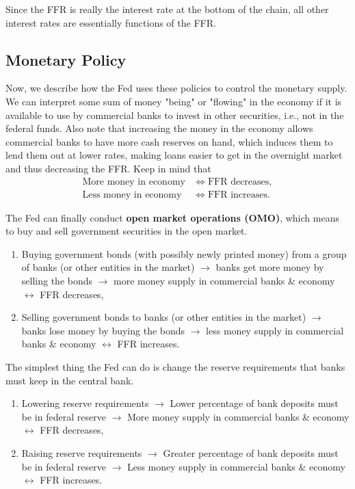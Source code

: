 \documentclass{article}
\begin{document}
    Since the FFR is really the interest rate at the bottom of the chain, all other interest rates are essentially functions of the FFR.   

  \subsection{Monetary Policy}

    Now, we describe how the Fed uses these policies to control the monetary supply. We can interpret some sum of money "being" or "flowing" in the economy if it is available to use by commercial banks to invest in other securities, i.e., not in the federal funds. Also note that increasing the money in the economy allows commercial banks to have more cash reserves on hand, which induces them to lend them out at lower rates, making loans easier to get in the overnight market and thus decreasing the FFR. Keep in mind that
    \begin{align*} 
      \text{More money in economy} & \iff \text{FFR decreases}, \\
      \text{Less money in economy} & \iff \text{FFR increases}.
    \end{align*}

    \begin{definition}
      The Fed can finally conduct \textbf{open market operations (OMO)}, which means to buy and sell government securities in the open market.
      \begin{enumerate}
        \item Buying government bonds (with possibly newly printed money) from a group of banks (or other entities in the market) $\rightarrow$ banks get more money by selling the bonds $\rightarrow$ more money supply in commercial banks \& economy $\leftrightarrow$ FFR decreases,
        \item Selling government bonds to banks (or other entities in the market) $\rightarrow$ banks lose money by buying the bonds $\rightarrow$ less money supply in commercial banks \& economy $\leftrightarrow$ FFR increases.
      \end{enumerate}
    \end{definition}

    \begin{definition}
      The simplest thing the Fed can do is change the reserve requirements that banks must keep in the central bank.
      \begin{enumerate}
        \item Lowering reserve requirements $\rightarrow$ Lower percentage of bank deposits must be in federal reserve $\rightarrow$  More money supply in commercial banks \& economy $\leftrightarrow$ FFR decreases,
        \item Raising reserve requirements $\rightarrow$ Greater percentage of bank deposits must be in federal reserve $\rightarrow$  Less money supply in commercial banks \& economy $\leftrightarrow$ FFR increases.
      \end{enumerate}
    \end{definition}
\end{document}
